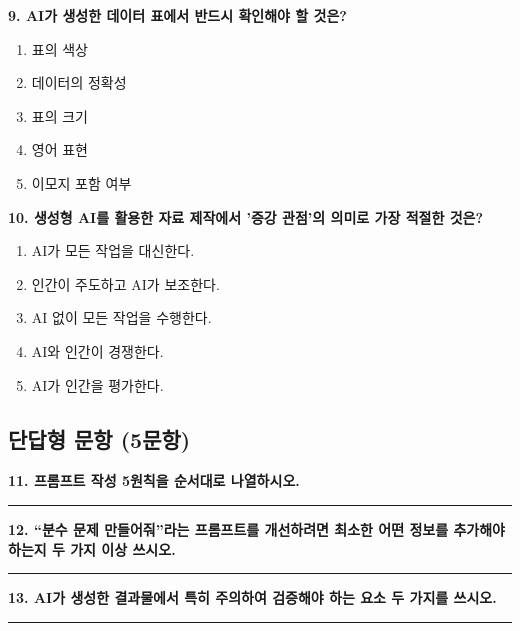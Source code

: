 \documentclass[11pt,a4paper]{article}
\begin{document}
\vspace{5mm}

\textbf{9. AI가 생성한 데이터 표에서 반드시 확인해야 할 것은?}

\begin{enumerate}[label=\textcircled{\small\arabic*}]
  \item 표의 색상
  \item 데이터의 정확성
  \item 표의 크기
  \item 영어 표현
  \item 이모지 포함 여부
\end{enumerate}

\vspace{5mm}

\textbf{10. 생성형 AI를 활용한 자료 제작에서 '증강 관점'의 의미로 가장 적절한 것은?}

\begin{enumerate}[label=\textcircled{\small\arabic*}]
  \item AI가 모든 작업을 대신한다.
  \item 인간이 주도하고 AI가 보조한다.
  \item AI 없이 모든 작업을 수행한다.
  \item AI와 인간이 경쟁한다.
  \item AI가 인간을 평가한다.
\end{enumerate}

\newpage

\subsection{단답형 문항 (5문항)}

\textbf{11. 프롬프트 작성 5원칙을 순서대로 나열하시오.}

\vspace{5mm}
\noindent\rule{\textwidth}{0.4pt}
\vspace{10mm}

\textbf{12. ``분수 문제 만들어줘''라는 프롬프트를 개선하려면 최소한 어떤 정보를 추가해야 하는지 두 가지 이상 쓰시오.}

\vspace{5mm}
\noindent\rule{\textwidth}{0.4pt}
\vspace{10mm}

\textbf{13. AI가 생성한 결과물에서 특히 주의하여 검증해야 하는 요소 두 가지를 쓰시오.}

\vspace{5mm}
\noindent\rule{\textwidth}{0.4pt}
\vspace{10mm}
\end{document}
